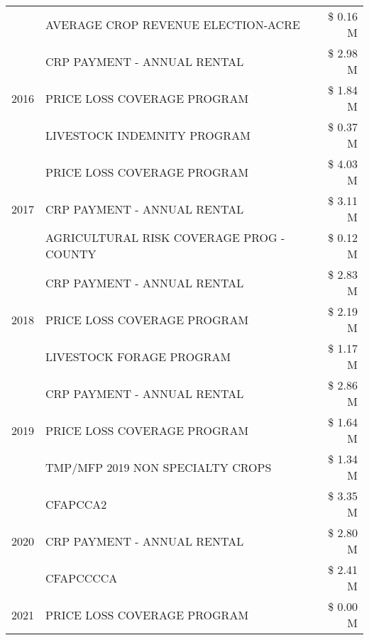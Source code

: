 \begin{tabular}{llr}
 & AVERAGE CROP REVENUE ELECTION-ACRE & \$ 0.16 M \\
\cline{1-3}
\multirow[t]{3}{*}{2016} & CRP PAYMENT - ANNUAL RENTAL & \$ 2.98 M \\
 & PRICE LOSS COVERAGE PROGRAM & \$ 1.84 M \\
 & LIVESTOCK INDEMNITY PROGRAM & \$ 0.37 M \\
\cline{1-3}
\multirow[t]{3}{*}{2017} & PRICE LOSS COVERAGE PROGRAM & \$ 4.03 M \\
 & CRP PAYMENT - ANNUAL RENTAL & \$ 3.11 M \\
 & AGRICULTURAL RISK COVERAGE PROG - COUNTY & \$ 0.12 M \\
\cline{1-3}
\multirow[t]{3}{*}{2018} & CRP PAYMENT - ANNUAL RENTAL & \$ 2.83 M \\
 & PRICE LOSS COVERAGE PROGRAM & \$ 2.19 M \\
 & LIVESTOCK FORAGE PROGRAM & \$ 1.17 M \\
\cline{1-3}
\multirow[t]{3}{*}{2019} & CRP PAYMENT - ANNUAL RENTAL & \$ 2.86 M \\
 & PRICE LOSS COVERAGE PROGRAM & \$ 1.64 M \\
 & TMP/MFP 2019 NON SPECIALTY CROPS & \$ 1.34 M \\
\cline{1-3}
\multirow[t]{3}{*}{2020} & CFAPCCA2 & \$ 3.35 M \\
 & CRP PAYMENT - ANNUAL RENTAL & \$ 2.80 M \\
 & CFAPCCCCA & \$ 2.41 M \\
\cline{1-3}
2021 & PRICE LOSS COVERAGE PROGRAM & \$ 0.00 M \\
\cline{1-3}
\bottomrule
\end{tabular}
